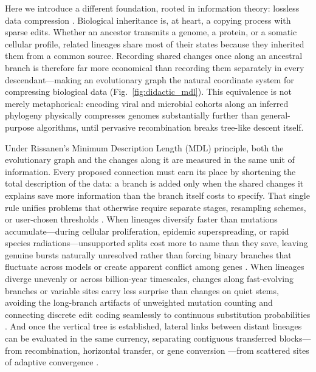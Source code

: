 \documentclass[11pt,a4paper]{article}
\begin{document}
Here we introduce a different foundation, rooted in information theory: lossless data compression \citep{rissanen1978modeling,rissanen1983universal}. Biological inheritance is, at heart, a copying process with sparse edits. Whether an ancestor transmits a genome, a protein, or a somatic cellular profile, related lineages share most of their states because they inherited them from a common source. Recording shared changes once along an ancestral branch is therefore far more economical than recording them separately in every descendant---making an evolutionary graph the natural coordinate system for compressing biological data (Fig.~\ref{fig:didactic_mdl}). This equivalence is not merely metaphorical: encoding viral and microbial cohorts along an inferred phylogeny physically compresses genomes substantially further than general-purpose algorithms, until pervasive recombination breaks tree-like descent itself.

Under Rissanen's Minimum Description Length (MDL) principle, both the evolutionary graph and the changes along it are measured in the same unit of information. Every proposed connection must earn its place by shortening the total description of the data: a branch is added only when the shared changes it explains save more information than the branch itself costs to specify. That single rule unifies problems that otherwise require separate stages, resampling schemes, or user-chosen thresholds \citep{felsenstein1985confidence,posada2004model,kosakovskypond2006gard}. When lineages diversify faster than mutations accumulate---during cellular proliferation, epidemic superspreading, or rapid species radiations---unsupported splits cost more to name than they save, leaving genuine bursts naturally unresolved rather than forcing binary branches that fluctuate across models or create apparent conflict among genes \citep{rokas2006animal,shen2017contentious,abadi2019model}. When lineages diverge unevenly or across billion-year timescales, changes along fast-evolving branches or variable sites carry less surprise than changes on quiet stems, avoiding the long-branch artifacts of unweighted mutation counting \citep{felsenstein1978cases} and connecting discrete edit coding seamlessly to continuous substitution probabilities \citep{tavare1986some,yang1994maximum,le2008improved}. And once the vertical tree is established, lateral links between distant lineages can be evaluated in the same currency, separating contiguous transferred blocks---from recombination, horizontal transfer, or gene conversion \citep{doolittle1999phylogenetic,worobey1999widespread,parham1996population}---from scattered sites of adaptive convergence \citep{liu2010convergent,li2010hearing}.
\end{document}

